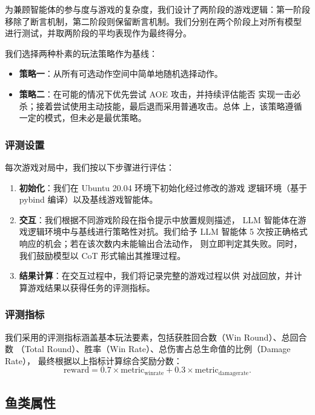 为兼顾智能体的参与度与游戏的复杂度，我们设计了两阶段的游戏逻辑：第一阶段
移除了断言机制，第二阶段则保留断言机制。我们分别在两个阶段上对所有模型
进行测试，并取两阶段的平均表现作为最终得分。

我们选择两种朴素的玩法策略作为基线：
\begin{itemize}
    \item \textbf{策略一}：从所有可选动作空间中简单地随机选择动作。
    \item \textbf{策略二}：在可能的情况下优先尝试 AOE 攻击，并持续评估能否
          实现一击必杀；接着尝试使用主动技能，最后退而采用普通攻击。总体
          上，该策略遵循一定的模式，但未必是最优策略。
\end{itemize}

\subsubsection*{评测设置}

每次游戏对局中，我们按以下步骤进行评估：
\begin{enumerate}
    \item \textbf{初始化}：我们在 Ubuntu 20.04 环境下初始化经过修改的游戏
          逻辑环境（基于 pybind 编译）以及基线游戏智能体。
    \item \textbf{交互}：我们根据不同游戏阶段在指令提示中放置规则描述，
          LLM 智能体在游戏逻辑环境中与基线进行策略性对抗。我们给予 LLM
          智能体 5 次按正确格式响应的机会；若在该次数内未能输出合法动作，
          则立即判定其失败。同时，我们鼓励模型以 CoT 形式输出其推理过程。
    \item \textbf{结果计算}：在交互过程中，我们将记录完整的游戏过程以供
          对战回放，并计算游戏结果以获得任务的评测指标。
\end{enumerate}

\subsubsection*{评测指标}

我们采用的评测指标涵盖基本玩法要素，包括获胜回合数（Win Round）、总回合数
（Total Round）、胜率（Win Rate）、总伤害占总生命值的比例（Damage Rate），
最终根据以上指标计算综合奖励分数：
\begin{equation}\label{eq:reward}
    \text{reward} = 0.7 \times \text{metric}_\text{winrate} + 0.3 \times \text{metric}_\text{damagerate}.
\end{equation}

\subsection{鱼类属性}

